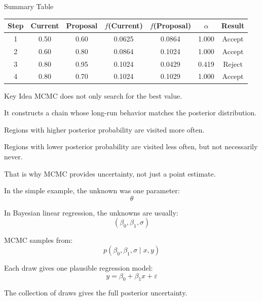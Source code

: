 \documentclass[aspectratio=43,11pt]{beamer}
\begin{document}
\begin{frame}{Summary Table}
\centering
\scriptsize
\begin{tabular}{ccccccc}
\toprule
Step & Current & Proposal & $f$(Current) & $f$(Proposal) & $\alpha$ & Result \\
\midrule
1 & 0.50 & 0.60 & 0.0625 & 0.0864 & 1.000 & Accept \\
2 & 0.60 & 0.80 & 0.0864 & 0.1024 & 1.000 & Accept \\
3 & 0.80 & 0.95 & 0.1024 & 0.0429 & 0.419 & Reject \\
4 & 0.80 & 0.70 & 0.1024 & 0.1029 & 1.000 & Accept \\
\bottomrule
\end{tabular}
\end{frame}

\begin{frame}{Key Idea}
MCMC does not only search for the best value.

\vspace{0.4cm}
It constructs a chain whose long-run behavior matches the posterior distribution.

\vspace{0.4cm}
Regions with higher posterior probability are visited more often.

\vspace{0.4cm}
Regions with lower posterior probability are visited less often, but not necessarily never.

\vspace{0.4cm}
That is why MCMC provides uncertainty, not just a point estimate.
\end{frame}

\begin{frame}{} %
In the simple example, the unknown was one parameter:
\[
\theta
\]

In Bayesian linear regression, the unknowns are usually:
\[
(\beta_0,\beta_1,\sigma)
\]

MCMC samples from:
\[
p(\beta_0,\beta_1,\sigma \mid x,y)
\]

Each draw gives one plausible regression model:
\[
y = \beta_0 + \beta_1 x + \varepsilon
\]

The collection of draws gives the full posterior uncertainty.
\end{frame}
\end{document}
